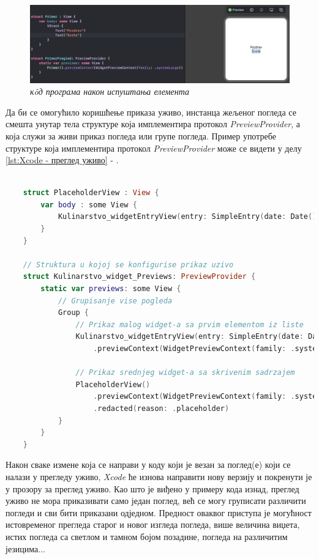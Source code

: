 \documentclass[12pt,oneside]{memoir}
\begin{document}
\begin{figure}[H]
\includegraphics[width=1\textwidth]{images/Drag_and_drop_2.png}
\centering
\caption{\textit{к\^{o}д програма након испуштања елемента}}
\label{slika:d&d2}
\end{figure}

Да би се омогућило коришћење приказа уживо, инстанца жељеног погледа се смешта унутар тела структуре која имплементира протокол \textit{PreviewProvider}, а која служи за живи приказ погледа или групе погледа. Пример употребе структуре која имплементира протокол \textit{PreviewProvider} може се видети у делу \ref{lst:Xcode - преглед уживо} - .

\begin{lstlisting}[caption=\textit{{Xcode - преглед уживо}}, label={lst:Xcode - преглед уживо}, language=Swift, frame=single]
    
    struct PlaceholderView : View {
        var body : some View {
            Kulinarstvo_widgetEntryView(entry: SimpleEntry(date: Date(), configuration: ConfigurationIntent(), recipe: RecipeModel.testData[0]))
        }
    }
    
    // Struktura u kojoj se konfigurise prikaz uzivo
    struct Kulinarstvo_widget_Previews: PreviewProvider {
        static var previews: some View {
            // Grupisanje vise pogleda
            Group {
                // Prikaz malog widget-a sa prvim elementom iz liste
                Kulinarstvo_widgetEntryView(entry: SimpleEntry(date: Date(), configuration: ConfigurationIntent(), recipe: RecipeModel.testData[0]))
                    .previewContext(WidgetPreviewContext(family: .systemSmall))
                
                // Prikaz srednjeg widget-a sa skrivenim sadrzajem
                PlaceholderView()
                    .previewContext(WidgetPreviewContext(family: .systemMedium))
                    .redacted(reason: .placeholder)
            }
        }
    }    
\end{lstlisting}

\indent Након сваке измене која се направи у коду који је везан за поглед(е) који се налази у прегледу уживо, \textit{Xcode} ће изнова направити нову верзију и покренути је у прозору за преглед уживо. Као што је виђено у примеру кода изнад, преглед уживо не мора приказивати само један поглед, већ се могу груписати различити погледи и сви бити приказани одједном. Предност оваквог приступа је могућност истовременог прегледа старог и новог изгледа погледа, више величина виџета, истих погледа са светлом и тамном бојом позадине, погледа на различитим језицима...
\end{document}
